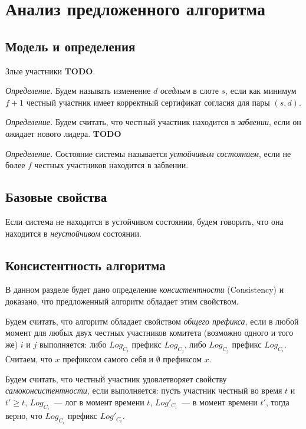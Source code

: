 
\chapter{Анализ предложенного алгоритма}  \label{chapter3}

\section{Модель и определения}
Злые участники \textbf{TODO}.

\textit{Определение.} Будем называть изменение $d$ \textit{оседлым} в слоте $s$, если как минимум $f+1$ честный участник имеет корректный сертификат согласия для пары $(s, d)$.

\textit{Определение.} Будем считать, что честный участник находится в \textit{забвении},  если он ожидает нового лидера. \textbf{TODO}

\textit{Определение.} Состояние системы называется \textit{устойчивым состоянием}, если не более $f$ честных участников находится в забвении.

\section{Базовые свойства}
Если система не находится в устойчивом состоянии, будем говорить, что она находится в \textit{неустойчивом} состоянии.

\section{Консистентность алгоритма}
В данном разделе будет дано определение \textit{консистентности} (Consistency)\cite{hybrid-consensus} и доказано, что предложенный алгоритм обладает этим свойством.

Будем считать, что алгоритм обладает свойством \textit{общего префикса}, если в любой момент для любых двух честных участников комитета (возможно одного и того же) $i$ и $j$  выполняется: либо $Log_{C_i}$ префикс $Log_{C_j}$, либо $Log_{C_j}$ префикс $Log_{C_i}$. Считаем, что $x$ префиксом самого себя и $\emptyset$ префиксом $x$.

Будем считать, что честный участник удовлетворяет свойству \textit{самоконсистентности}, если выполняется: пусть участник честный во время $t$ и $t' \ge t$, $Log_{C_i}$~--- лог в момент времени $t$, $Log'_{C_i}$~--- в момент времени $t'$, тогда верно, что $Log_{C_i}$ префикс $Log'_{C_i}$.

